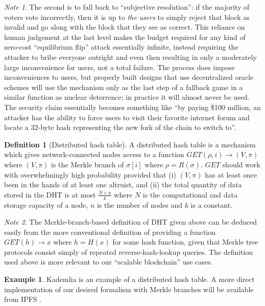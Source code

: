 \documentclass[11pt,a4paper]{report}
\theoremstyle{plain}
\theoremstyle{definition}
\newtheorem{defn}{Definition}[chapter]
\newtheorem{exmp}{Example}[section]
\theoremstyle{remark}
\newtheorem*{note}{Note}
\begin{document}
\begin{note}
The second is to fall back to ``subjective resolution'': if the majority of voters vote incorrectly, then it is up to \emph{the users} to simply reject that block as invalid and go along with the block that they see as correct. This reliance on human judgement at the last level makes the budget required for any kind of zero-cost ``equilibrium flip'' attack essentially infinite, instead requiring the attacker to bribe everyone outright and even then resulting in only a moderately large inconvenience for users, not a total failure. The process does impose inconveniences to users, but properly built designs that use decentralized oracle schemes will use the mechanism only as the last step of a fallback game in a similar function as nuclear deterrence; in practice it will almost never be used. The security claim essentially becomes something like ``by paying \$100 million, an attacker has the ability to force users to visit their favorite internet forum and locate a 32-byte hash representing the new fork of the chain to switch to''.
\end{note}

\begin{defn}[Distributed hash table]
A distributed hash table is a mechanism which gives network-connected nodes access to a function $GET(\rho, i) \rightarrow (V, \pi)$ where $(V, \pi)$ is the Merkle branch of $\sigma[i]$ where $\rho = R(\sigma)$. $GET$ should work with overwhelmingly high probability provided that (i) $(V, \pi)$ has at least once been in the hands of at least one altruist, and (ii) the total quantity of data stored in the DHT is at most $\frac{N \times  n}{k}$ where $N$ is the computational and data storage capacity of a node, $n$ is the number of nodes and $k$ is a constant.
\end{defn}

\begin{note}
The Merkle-branch-based definition of DHT given above can be deduced easily from the more conventional definition of providing a function $GET(h) \rightarrow x$ where $h = H(x)$ for some hash function, given that Merkle tree protocols consist simply of repeated reverse-hash-lookup queries. The definition used above is more relevant to our ``scalable blockchain'' use cases.
\end{note}

\begin{exmp}
Kademlia \citep{maymounkov_kademlia:_2002} is an example of a distributed hash table. A more direct implementation of our desired formalism with Merkle branches will be available from IPFS \citep{benet_ipfs_2014}.
\end{exmp}
\end{document}
